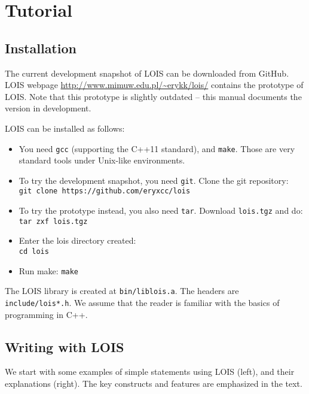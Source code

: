 \vspace{-1em}
\section{Tutorial}\label{sec_tut}

\subsection{Installation}


The current development snapshot of LOIS can be downloaded from GitHub.
LOIS webpage \url{http://www.mimuw.edu.pl/~erykk/lois/} contains the prototype
of LOIS. Note that this prototype is slightly outdated -- this manual
documents the version in development.

LOIS can be installed as follows:

\begin{itemize}
\item You need {\tt gcc} (supporting the C++11 standard), and {\tt make}. Those are very standard tools under Unix-like environments.
\item To try the development snapshot, you need {\tt git}.
Clone the git repository: \\ {\tt git clone https://github.com/eryxcc/lois}
\item To try the prototype instead, you also need {\tt tar}. Download {\tt lois.tgz} and do: {\tt tar zxf lois.tgz}
\item Enter the lois directory created: \\ {\tt cd lois}
\item Run make: {\tt make}
\end{itemize}

The LOIS library is created at {\tt bin/liblois.a}. The headers are 
{\tt include/lois*.h}. We assume that the reader is familiar with the basics
of programming in C++.

\subsection{Writing with LOIS}

We start with some examples of 
simple statements using LOIS (left), 
and their explanations (right). 
The key constructs and features are emphasized in the text.

\begin{codecommenttable}
\end{codecommenttable}

